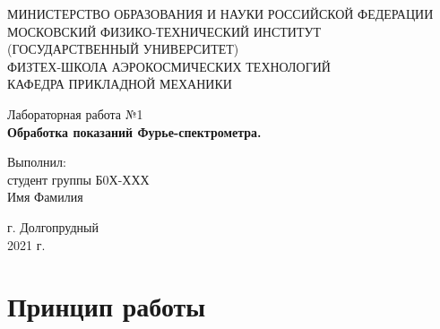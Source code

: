 \documentclass[a4paper,12pt]{article} %
\begin{document}
    \begin{center}
        \normalsize{МИНИСТЕРСТВО ОБРАЗОВАНИЯ И НАУКИ РОССИЙСКОЙ ФЕДЕРАЦИИ\\ 
                    МОСКОВСКИЙ ФИЗИКО-ТЕХНИЧЕСКИЙ ИНСТИТУТ \\ 
                    (ГОСУДАРСТВЕННЫЙ УНИВЕРСИТЕТ)\\
                    ФИЗТЕХ-ШКОЛА АЭРОКОСМИЧЕСКИХ ТЕХНОЛОГИЙ\\
                    КАФЕДРА ПРИКЛАДНОЙ МЕХАНИКИ}
        
        \vspace{13ex}
        
        \normalsize{Лабораторная работа №1\\}
        \vspace{5ex}
        \textbf{Обработка показаний Фурье-спектрометра.}

        \vspace{15ex}

        \normalsize{Выполнил:\\
                    студент группы Б0Х-ХХХ\\
                    Имя Фамилия}
        
    \end{center}
            
    \vfill
            
    \begin{center}
        г. Долгопрудный\\ 
        2021 г.
    \end{center}

    \thispagestyle{empty} %
    \newpage

    \tableofcontents{} %
    \newpage

    \section{Принцип работы}

\end{document}
